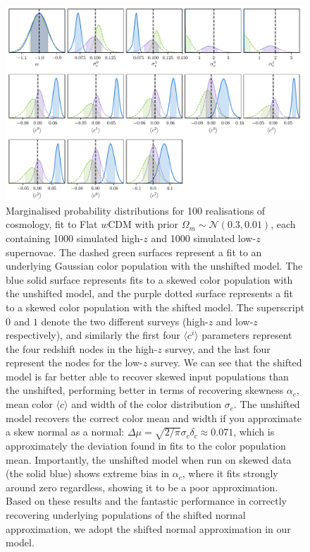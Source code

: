 \documentclass[a4paper,fleqn,usenatbib]{emulateapj}
\begin{document}
\begin{figure}
	\begin{center}
		\includegraphics[width=\textwidth]{simple_w_shift_dist_0.pdf}
	\end{center}
	\caption{Marginalised probability distributions for 100 realisations of cosmology, fit to Flat $w$CDM with prior $\Omega_m \sim \mathcal{N}(0.3, 0.01)$, each containing 1000 simulated high-$z$ and 1000 simulated low-$z$ supernovae. The dashed green surfaces represent a fit to an underlying Gaussian color population with the unshifted model. The blue solid surface represents fits to a skewed color population with the unshifted model, and the purple dotted surface represents a fit to a skewed color population with the shifted model. The superscript $0$ and $1$ denote the two different surveys (high-$z$ and low-$z$ respectively), and similarly the first four $\langle c^i \rangle$ parameters represent the four redshift nodes in the high-$z$ survey, and the last four represent the nodes for the low-$z$ survey. We can see that the shifted model is far better able to recover skewed input populations than the unshifted, performing better in terms of recovering skewness $\alpha_c$, mean color $\langle c \rangle$ and width of the color distribution $\sigma_c$. The unshifted model recovers the correct color mean and width if you approximate a skew normal as a normal: $\Delta\mu = \sqrt{2/\pi}\sigma_c\delta_c \approx 0.071$, which is approximately the deviation found in fits to the color population mean. Importantly, the unshifted model when run on skewed data (the solid blue) shows extreme bias in $\alpha_c$, where it fits strongly around zero regardless, showing it to be a poor approximation. Based on these results and the fantastic performance in correctly recovering underlying populations of the shifted normal approximation, we adopt the shifted normal approximation in our model.}
	\label{fig:simple_w_super}
\end{figure}
\end{document}

